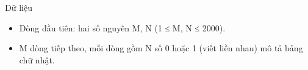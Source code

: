 Dữ liệu
\begin{itemize}
	\item Dòng đầu tiên: hai số nguyên M, N (1 ≤ M, N ≤ 2000).
	\item M dòng tiếp theo, mỗi dòng gồm N số 0 hoặc 1 (viết liền nhau) mô tả bảng chữ nhật.
\end{itemize}